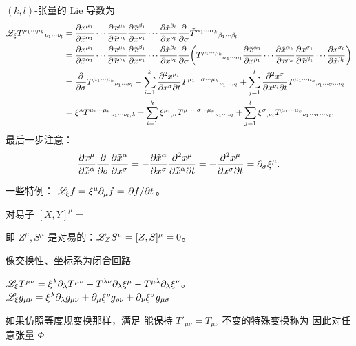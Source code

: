 $(k,l)$-张量的 Lie 导数为
\begin{align*}
    \mathscr{L}_\xi T^{\mu_1\cdots\mu_k}{}_{\nu_1\cdots\nu_l}&=\pdv{x^{\mu_1}}{\tilde{x}^{\alpha_1}}\cdots\pdv{x^{\mu_k}}{\tilde{x}^{\alpha_k}}\pdv{\tilde{x}^{\beta_1}}{x^{\nu_1}}\cdots\pdv{\tilde{x}^{\beta_l}}{x^{\nu_l}}\pdv{\sigma}\tilde T^{\alpha_1\cdots\alpha_k}{}_{\beta_1\cdots\beta_l}\\
    &=\pdv{x^{\mu_1}}{\tilde{x}^{\alpha_1}}\cdots\pdv{x^{\mu_k}}{\tilde{x}^{\alpha_k}}\pdv{\tilde{x}^{\beta_1}}{x^{\nu_1}}\cdots\pdv{\tilde{x}^{\beta_l}}{x^{\nu_l}}\pdv{\sigma}( T^{\rho_1\cdots\rho_k}{}_{\sigma_1\cdots\sigma_l}\pdv{\tilde{x}^{\alpha_1}}{x^{\rho_1}}\cdots\pdv{\tilde{x}^{\alpha_k}}{x^{\rho_k}}\pdv{x^{\sigma_1}}{\tilde{x}^{\beta_1}}\cdots\pdv{x^{\sigma_l}}{\tilde{x}^{\beta_l}})\\
    &=\pdv{\sigma}T^{\mu_1\cdots\mu_k}{}_{\nu_1\cdots\nu_l}-\sum_{i=1}^k \pdv{x^{\mu_i}}{x^{\sigma}}{t} T^{\mu_1\cdots\sigma\cdots\mu_k}{}_{\nu_1\cdots\nu_l} + \sum_{j=1}^l \pdv{x^{\sigma}}{x^{\nu_i}}{t} T^{\mu_1\cdots\mu_k}{}_{\nu_1\cdots\sigma\cdots\nu_l}\\
    &=\xi^\lambda T^{\mu_1\cdots\mu_k}{}_{\nu_1\cdots\nu_l,\lambda}-\sum_{i=1}^k \xi^{\mu_i}{}_{,\sigma} T^{\mu_1\cdots\sigma\cdots\mu_k}{}_{\nu_1\cdots\nu_l} + \sum_{j=1}^l \xi^{\sigma}{}_{,\nu_i} T^{\mu_1\cdots\mu_k}{}_{\nu_1\cdots\sigma\cdots\nu_l},
\end{align*}
最后一步注意：
\[\pdv{x^{\mu}}{\tilde{x}^{\alpha}}\pdv{\sigma}\pdv{\tilde x^{\alpha}}{x^{\sigma}} = - \pdv{\tilde x^{\alpha}}{x^{\sigma}}\pdv{x^{\mu}}{\tilde{x}^{\alpha}}{t} = - \pdv{x^{\mu}}{x^{\sigma}}{t}=\partial_\sigma\xi^\mu.\]


一些特例：
$\mathscr{L}_\xi f = \xi^\mu\partial_\mu f = \pdv*{f}{t}$。

对易子 $[X,Y]^\mu=$


即 $Z^\mu,S^\mu$ 是对易的：$\mathscr{L}_Z S^\mu = [Z,S]^\mu = 0$。

像交换性、坐标系为闭合回路 

$\mathscr{L}_\xi T^{\mu\nu}=\xi^\lambda \partial_\lambda T^{\mu\nu}-T^{\lambda\nu}\partial_\lambda \xi^\mu - T^{\mu\lambda}\partial_\lambda \xi^\nu$。$\mathscr{L}_\xi g_{\mu\nu}=\xi^\lambda \partial_\lambda g_{\mu\nu}+\partial_\mu \xi^\rho g_{\rho \nu}+\partial_\nu\xi^\sigma g_{\mu\sigma}$



如果仿照等度规变换那样，满足
能保持 $T'_{\mu\nu}=T_{\mu\nu}$ 不变的特殊变换称为
因此对任意张量 $\Phi$


